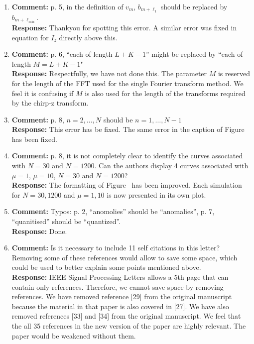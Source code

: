 \documentclass[a4paper,10pt]{article}
\begin{document}
\begin{enumerate}
\begin{enumerate}
\end{enumerate}



\item\textbf{Comment:}
p. 5, in the definition of $v_m$, $b_{m+\ell_1}$ should be replaced by $b_{m+\ell_{\text{min}}}$.
\\
\textbf{Response:}
Thankyou for spotting this error.  A similar error was fixed in equation for $I_z$ directly above this. 


\item\textbf{Comment:}
p. 6, ``each of length $L+K-1$'' might be replaced by ``each of length $M = L + K - 1$"
\\
\textbf{Response:}
Respectfully, we have not done this.  The parameter $M$ is reserved for the length of the FFT used for the single Fourier transform method.  We feel it is confusing if $M$ is also used for the length of the transforms required by the chirp-z transform.


\item\textbf{Comment:}
p. 8, $n = 2,\dots,N$ should be $n = 1, \dots, N - 1$
\\
\textbf{Response:}
This error has be fixed.  The same error in the caption of Figure~ has been fixed.


\item\textbf{Comment:}
p. 8, it is not completely clear to identify the curves associated with $N = 30$ and $N = 1200$. Can the authors display 4 curves associated with $\mu= 1$, $\mu = 10$, $N = 30$ and $N = 1200$?
\\
\textbf{Response:}
The formatting of Figure~ has been improved.  Each simulation for $N=30,1200$ and $\mu=1,10$ is now presented in its own plot.

\item\textbf{Comment:}
Typos: p. 2, ``anomolies'' should be ``anomalies'', p. 7, ``quanitised'' should be
``quantized''.
\\
\textbf{Response:}
Done.


\item\textbf{Comment:} 
Is it necessary to include 11 self citations in this letter? Removing some of
these references would allow to save some space, which could be used to better
explain some points mentioned above.
\\
\textbf{Response:}
IEEE Signal Processing Letters allows a 5th page that can contain only references.  Therefore, we cannot save space by removing references.   We have removed reference [29] from the original manuscript because the material in that paper is also covered in [27].  We have also removed references [33] and [34] from the original manuscript. We feel that the all 35 references in the new version of the paper are highly relevant. The paper would be weakened without them.

\end{enumerate}
\end{document}
